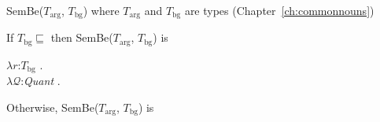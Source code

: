SemBe($T_{\mathrm{arg}}$, $T_{\mathrm{bg}}$)  where $T_{\mathrm{arg}}$
and $T_{\mathrm{bg}}$ are types (Chapter~\ref{ch:commonnouns})

If $T_{\mathrm{bg}}\sqsubseteq$
then SemBe($T_{\mathrm{arg}}$, $T_{\mathrm{bg}}$) is


$\lambda r$:$T_{\mathrm{bg}}$ . \\
\hspace*{1em}$\lambda\mathcal{Q}$:\textit{Quant} . \\
\hspace*{2em}


Otherwise, SemBe($T_{\mathrm{arg}}$, $T_{\mathrm{bg}}$) is


